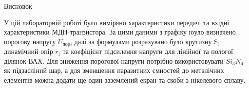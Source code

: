 \documentclass[a4paper,14pt]{extreport}
\begin{document}
\begin{center} Висновок\\ \end{center}

У цій лабораторній роботі було виміряно характеристики передачі та
вхідні характеристики МДН-транзистора. За цими
даними з графіку юуло визначено порогову напругу $U_{\text{пор}}$, далі за формулами розрахувано було крутизну
S, динамічний опір $r_i$ та коефіцієнт підсилення напруги для
лінійної та пологої ділянок ВАХ. Для зниження порогової напруги потрібно використовувати $Si_3N_4$ як підзасліний шар, а для зменшення паразитних ємностей до металічних елементів можна додати
ще один заземлений екран та скоби з нікелевого сплаву.
\end{document}
